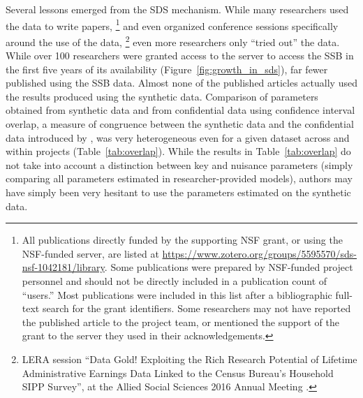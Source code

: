 \documentclass{article}
\begin{document}
Several lessons emerged from the SDS mechanism. While many researchers used the data to write papers,
%
\footnote{All publications directly funded by the supporting NSF grant, or using the NSF-funded server, are listed at \url{https://www.zotero.org/groups/5595570/sds-nsf-1042181/library}. Some publications were prepared by NSF-funded project personnel and should not be directly included in a publication count of ``users.'' Most publications were included in this list after a bibliographic full-text search for the grant identifiers. Some researchers may not have reported the published article to the project team, or mentioned the support of the grant to the server they used in their acknowledgements.} 
%
and even organized conference sessions specifically around the use of the data,
%
\footnote{LERA session ``Data Gold! Exploiting the Rich Research Potential of Lifetime
Administrative Earnings Data Linked to the Census Bureau’s
Household SIPP Survey'',  at the Allied Social Sciences 2016 Annual Meeting \citep{american_economic_association_allied_2016}. }
%
even more researchers only ``tried out'' the data. While over 100 researchers were granted access to the server to access the SSB in the first five years of its availability (Figure~\ref{fig:growth_in_sds}), far fewer published using the SSB data. Almost none of the published articles actually used the results produced using the synthetic data. Comparison of parameters obtained from synthetic data and from confidential data using confidence interval overlap, a measure of congruence between the synthetic data and the confidential data introduced by \citet{tas2006}, was very heterogeneous even for a given dataset across and within projects (Table~\ref{tab:overlap}). While the results in Table~\ref{tab:overlap} do not take into account a distinction between key and nuisance parameters (simply comparing all parameters estimated in researcher-provided models), authors may have simply been very hesitant to use the parameters estimated on the synthetic data.
\end{document}

